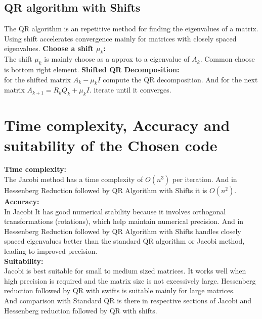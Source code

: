 \documentclass[a4paper,12pt]{article}
\begin{document}
\subsection{QR algorithm with Shifts}
The QR algorithm is an repetitive method for finding the eigenvalues of a matrix. Using shift accelerates convergence mainly for matrices with closely spaced eigenvalues. 
\textbf{Choose a shift $\mu_k$:}\\
The shift $\mu_k$ is mainly choose as a approx to a eigenvalue of $A_k$. Common choose is bottom right element. 
\textbf{Shifted QR Decomposition:}\\
for the shifted matrix $A_k-\mu_kI$ compute the QR decomposition. And for the next matrix $A_{k+1}=R_kQ_k+\mu_kI$.
iterate until it converges.
\section{Time complexity, Accuracy and suitability of the Chosen code}
\textbf{Time complexity:}\\
The Jacobi method has a time complexity of $O(n^3)$ per iteration. And in Hessenberg Reduction followed by QR Algorithm with Shifts it is $O(n^2)$.\\
\textbf{Accuracy:}\\
In Jacobi It has good numerical stability because it involves orthogonal transformations (rotations), which help maintain numerical precision. And in Hessenberg Reduction followed by QR Algorithm with Shifts handles closely spaced eigenvalues better than the standard QR algorithm or Jacobi method, leading to improved precision.\\
\textbf{Suitability:}\\
Jacobi is best suitable for small to medium sized matrices. It works well when high precision is required and the matrix size is not excessively large. Hessenberg reduction followed by QR with swifts is suitable mainly for large matrices.\\

And comparison with Standard  QR is there in respective sections of Jacobi and Hessenberg reduction followed by QR with shifts.
\end{document}
